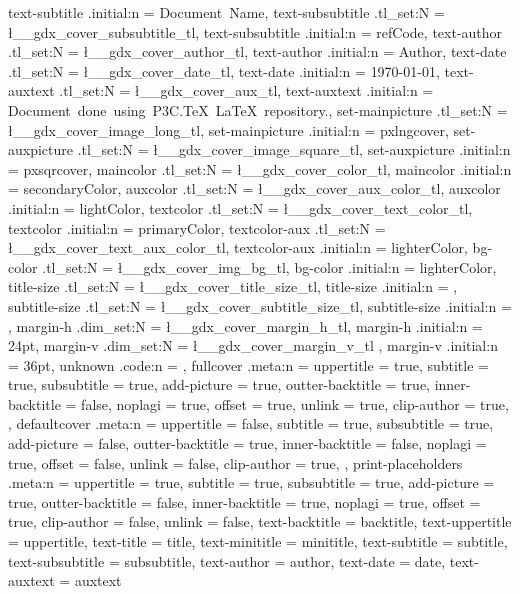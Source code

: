 {		text-subtitle			.initial:n 	=				{Document~Name},
	text-subsubtitle		.tl_set:N		=	\l__gdx_cover_subsubtitle_tl,
		text-subsubtitle		.initial:n 	=		{refCode},
	text-author				.tl_set:N		=	\l__gdx_cover_author_tl,
		text-author				.initial:n 	=		{Author},
	text-date 				.tl_set:N		=	\l__gdx_cover_date_tl,
		text-date				.initial:n 	=		{\today},
	text-auxtext 			.tl_set:N		=	\l__gdx_cover_aux_tl,
	text-auxtext				.initial:n 	=	{ Document~done~using~P3C.TeX~LaTeX~repository.},
	set-mainpicture			.tl_set:N		=	\l__gdx_cover_image_long_tl,
		set-mainpicture			.initial:n 	=	pxlngcover,
	set-auxpicture			.tl_set:N		=	\l__gdx_cover_image_square_tl,
		set-auxpicture			.initial:n 	=	pxsqrcover,
	maincolor	 			.tl_set:N		=	\l__gdx_cover_color_tl,
		maincolor	 			.initial:n	=	secondaryColor,
	auxcolor	 			.tl_set:N		=	\l__gdx_cover_aux_color_tl,
		auxcolor	 			.initial:n	=	lightColor,
	textcolor				.tl_set:N		=	\l__gdx_cover_text_color_tl,
		textcolor 				.initial:n	=	primaryColor,
	textcolor-aux 			.tl_set:N		=	\l__gdx_cover_text_aux_color_tl,
		textcolor-aux			.initial:n	=	lighterColor,
	bg-color 				.tl_set:N		=	\l__gdx_cover_img_bg_tl,
		bg-color 				.initial:n	=	lighterColor,
	title-size 				.tl_set:N		=	\l__gdx_cover_title_size_tl,
		title-size 				.initial:n	=	\Huge,
	subtitle-size 			.tl_set:N		=	\l__gdx_cover_subtitle_size_tl,
		subtitle-size 			.initial:n	=	\large,
	margin-h				.dim_set:N		=	\l__gdx_cover_margin_h_tl,
		margin-h 				.initial:n	=	{24pt},
	margin-v 				.dim_set:N		=	\l__gdx_cover_margin_v_tl ,
		margin-v 				.initial:n	=	{36pt},
	unknown .code:n ={ },
	fullcover				.meta:n = {
		uppertitle 			=	true,
		subtitle 			=	true,
		subsubtitle 		=	true,
		add-picture			=	true,
		outter-backtitle	=	true,
		inner-backtitle 	=	false,
		noplagi				=	true,
		offset 				=	true,
		unlink				=	true,
		clip-author			=	true,
	},
	defaultcover				.meta:n = {
		uppertitle 			=	false,
		subtitle 			=	true,
		subsubtitle 		=	true,
		add-picture			=	false,
		outter-backtitle	=	true,
		inner-backtitle 	=	false,
		noplagi				=	true,
		offset 				=	false,
		unlink				=	false,
		clip-author			=	true,
	},
	print-placeholders		.meta:n = 	{
		uppertitle 			=	true,
		subtitle 			=	true,
		subsubtitle 		=	true,
		add-picture			=	true,
		outter-backtitle	=	false,
		inner-backtitle 	=	true,
		noplagi				=	true,
		offset 				=	true,
		clip-author			=	false,
		unlink				=	false,
		text-backtitle		=	backtitle,
		text-uppertitle 	=	uppertitle,
		text-title		 	=	title,
		text-minititle		=	minititle,
		text-subtitle 		=	subtitle,
		text-subsubtitle	=	subsubtitle,
		text-author			=	author,
		text-date 			=	date,
		text-auxtext 		=	auxtext
	}
}
